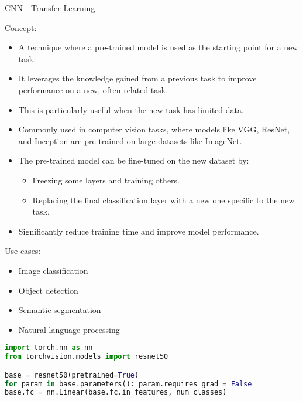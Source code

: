 \begin{frame}{CNN - Transfer Learning}
\begin{block}{Concept:}
    \begin{itemize}
        \item A technique where a pre-trained model is used as the starting point for a new task.
        \item It leverages the knowledge gained from a previous task to improve performance on a new, often related task.
        \item This is particularly useful when the new task has limited data.
        \item Commonly used in computer vision tasks, where models like VGG, ResNet, and Inception are pre-trained on large datasets like ImageNet.
        \item The pre-trained model can be fine-tuned on the new dataset by:
            \begin{itemize}
                \item Freezing some layers and training others.
                \item Replacing the final classification layer with a new one specific to the new task.
            \end{itemize}
        \item Significantly reduce training time and improve model performance.
    \end{itemize}
\end{block}

\framebreak

\begin{block}{Use cases:}
    \begin{itemize}
        \item Image classification
        \item Object detection
        \item Semantic segmentation
        \item Natural language processing
    \end{itemize}
\end{block}

\begin{lstlisting}[language=Python, caption={Code snippet (PyTorch)}, basicstyle=\ttfamily\footnotesize]
import torch.nn as nn
from torchvision.models import resnet50

base = resnet50(pretrained=True)
for param in base.parameters(): param.requires_grad = False
base.fc = nn.Linear(base.fc.in_features, num_classes)
\end{lstlisting}
\end{frame}  